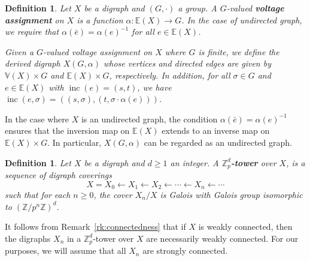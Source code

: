 \documentclass[11pt]{amsart}
\DeclareMathOperator{\inc}{inc}
\newtheorem{defn}[theorem]{Definition}
\numberwithin{equation}{section}
\theoremstyle{remark}
\newcommand{\EE}{\mathbb{E}}
\newcommand{\?}{\stackrel{?}{=}}
\newcommand{\ZZ}{\mathbb{Z}}
\newcommand{\Zp}{\mathbb{Z}_p}
\newcommand{\VV}{\mathbb{V}}
\begin{document}
\begin{defn}
    Let $X$ be a digraph and $(G,\cdot)$ a group. A $G$-valued \textbf{voltage assignment} on $X$ is a function $\alpha:\EE(X)\rightarrow G$. In the case of undirected graph, we require that $\alpha(\bar e)=\alpha(e)^{-1}$ for all $e\in\EE(X)$.

    Given a $G$-valued voltage assignment on $X$ where $G$ is finite, we define the derived digraph $X(G,\alpha)$ whose vertices and directed edges are given by $\VV(X)\times G$ and $\EE(X)\times G$, respectively. {In addition, for all $\sigma\in G$ and $e\in\EE(X)$ with $\inc(e)=(s,t)$, we have $\inc(e,\sigma)=((s,\sigma),(t,\sigma\cdot\alpha(e)))$.}

\end{defn}

In the case where $X$ is an undirected graph, the condition $\alpha(\bar e)=\alpha(e)^{-1}$ ensures that the inversion map on $\EE(X)$ extends to an inverse map on $\EE(X)\times G$. In particular, $X(G,\alpha)$ can be regarded as an undirected graph.

\begin{defn}\label{def:tower}
    Let $X$ be a digraph and $d\ge1$ an integer. A \textbf{$\Zp^d$-tower} over $X$, is a sequence of digraph coverings
\[
X=X_0\leftarrow X_1\leftarrow X_2\leftarrow \cdots \leftarrow X_n\leftarrow\cdots
\]
such that for each $n\ge0$, the cover $X_n/X$ is Galois with Galois group isomorphic to $(\ZZ/p^n\ZZ)^d$.
\end{defn}

It follows from Remark~\ref{rk:connectedness} that if $X$ is weakly connected, then the digraphs $X_n$ in a $\Zp^d$-tower over $X$ are necessarily weakly connected. For our purposes, we will assume that all $X_n$ are strongly connected.
\end{document}
